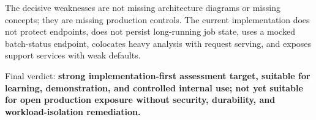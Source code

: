 The decisive weaknesses are not missing architecture diagrams or missing concepts; they are missing production controls. The current implementation does not protect endpoints, does not persist long-running job state, uses a mocked batch-status endpoint, colocates heavy analysis with request serving, and exposes support services with weak defaults.

Final verdict: \textbf{strong implementation-first assessment target, suitable for learning, demonstration, and controlled internal use; not yet suitable for open production exposure without security, durability, and workload-isolation remediation.}


